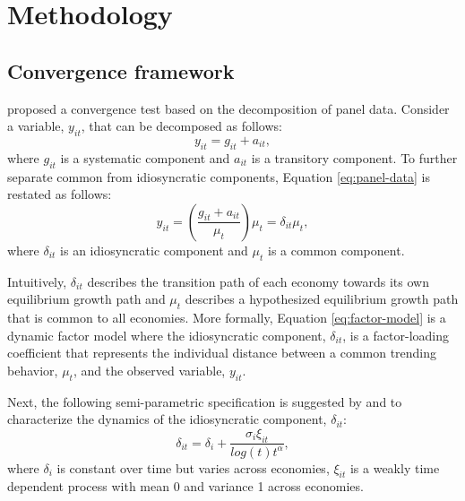 \documentclass[11pt,a4paper,]{article}
\begin{document}


\hypertarget{methodology}{%
\section{Methodology}\label{methodology}}

\hypertarget{convergence-framework}{%
\subsection{Convergence framework}\label{convergence-framework}}

\textcite{phillips2007transition} proposed a convergence test based on the decomposition of panel data.
Consider a variable, \(y_{it}\), that can be decomposed as follows:
\begin{equation}
y_{it}=g_{it}+a_{it},
\label{eq:panel-data}
\end{equation}
where \(g_{it}\) is a systematic component and \(a_{it}\) is a transitory component.
To further separate common from idiosyncratic components, Equation \ref{eq:panel-data} is restated as follows:
\begin{equation}
y_{it}=\left(\frac{g_{it}+a_{it}}{\mu_{t}}\right)\mu_{t}=\delta_{it}\mu_{t},
\label{eq:factor-model}
\end{equation}
where \(\delta_{it}\) is an idiosyncratic component and \(\mu_{t}\) is a common component.

Intuitively, \(\delta_{it}\) describes the transition path of each economy towards its own equilibrium growth path and \(\mu_{t}\) describes a hypothesized equilibrium growth path that is common to all economies.
More formally, Equation \ref{eq:factor-model} is a dynamic factor model where the idiosyncratic component, \(\delta_{it}\), is a factor-loading coefficient that represents the individual distance between a common trending behavior, \(\mu_{t}\), and the observed variable, \(y_{it}\).

Next, the following semi-parametric specification is suggested by \textcite{phillips2007transition} and \textcite{phillips2009economic} to characterize the dynamics of the idiosyncratic component, \(\delta_{it}\):
\begin{equation}
\delta_{it}=\delta_{i}+\frac{\sigma_{i}\xi_{it}}{log\left(t\right)t^{\alpha}},
\label{eq:semiparametric}
\end{equation}
where \(\delta_{i}\) is constant over time but varies across economies, \(\xi_{it}\) is a weakly time dependent process with mean 0 and variance 1 across economies.
\end{document}
